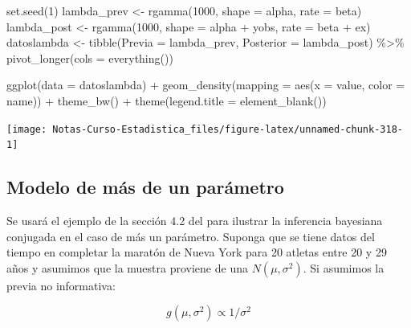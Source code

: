 \documentclass[
  12pt,
]{book}
\newenvironment{Shaded}{\begin{snugshade}}{\end{snugshade}}
\newcommand{\AttributeTok}[1]{\textcolor[rgb]{0.77,0.63,0.00}{#1}}
\newcommand{\DecValTok}[1]{\textcolor[rgb]{0.00,0.00,0.81}{#1}}
\newcommand{\FunctionTok}[1]{\textcolor[rgb]{0.00,0.00,0.00}{#1}}
\newcommand{\NormalTok}[1]{#1}
\newcommand{\OtherTok}[1]{\textcolor[rgb]{0.56,0.35,0.01}{#1}}
\newcommand{\SpecialCharTok}[1]{\textcolor[rgb]{0.00,0.00,0.00}{#1}}
\theoremstyle{definition}
\theoremstyle{definition}
\theoremstyle{definition}
\theoremstyle{definition}
\theoremstyle{remark}
\begin{document}
\begin{Shaded}
\begin{Highlighting}[]
\FunctionTok{set.seed}\NormalTok{(}\DecValTok{1}\NormalTok{)}
\NormalTok{lambda\_prev }\OtherTok{\textless{}{-}} \FunctionTok{rgamma}\NormalTok{(}\DecValTok{1000}\NormalTok{, }\AttributeTok{shape =}\NormalTok{ alpha, }\AttributeTok{rate =}\NormalTok{ beta)}
\NormalTok{lambda\_post }\OtherTok{\textless{}{-}} \FunctionTok{rgamma}\NormalTok{(}\DecValTok{1000}\NormalTok{, }\AttributeTok{shape =}\NormalTok{ alpha }\SpecialCharTok{+}\NormalTok{ yobs, }\AttributeTok{rate =}\NormalTok{ beta }\SpecialCharTok{+}
\NormalTok{    ex)}
\NormalTok{datoslambda }\OtherTok{\textless{}{-}} \FunctionTok{tibble}\NormalTok{(}\AttributeTok{Previa =}\NormalTok{ lambda\_prev, }\AttributeTok{Posterior =}\NormalTok{ lambda\_post) }\SpecialCharTok{\%\textgreater{}\%}
    \FunctionTok{pivot\_longer}\NormalTok{(}\AttributeTok{cols =} \FunctionTok{everything}\NormalTok{())}

\FunctionTok{ggplot}\NormalTok{(}\AttributeTok{data =}\NormalTok{ datoslambda) }\SpecialCharTok{+} \FunctionTok{geom\_density}\NormalTok{(}\AttributeTok{mapping =} \FunctionTok{aes}\NormalTok{(}\AttributeTok{x =}\NormalTok{ value,}
    \AttributeTok{color =}\NormalTok{ name)) }\SpecialCharTok{+} \FunctionTok{theme\_bw}\NormalTok{() }\SpecialCharTok{+} \FunctionTok{theme}\NormalTok{(}\AttributeTok{legend.title =} \FunctionTok{element\_blank}\NormalTok{())}
\end{Highlighting}
\end{Shaded}

\begin{center}\texttt{[image: Notas-Curso-Estadistica\_files/figure-latex/unnamed-chunk-318-1]} \end{center}

\hypertarget{modelo-de-muxe1s-de-un-paruxe1metro}{%
\subsection{Modelo de más de un parámetro}\label{modelo-de-muxe1s-de-un-paruxe1metro}}

Se usará el ejemplo de la sección 4.2 del \autocite{Albert2009} para ilustrar la inferencia bayesiana conjugada en el caso de más un parámetro. Suponga que se tiene datos del tiempo en completar la maratón de Nueva York para 20 atletas entre 20 y 29 años y asumimos que la muestra proviene de una \(N(\mu,\sigma^2)\). Si asumimos la previa no informativa:

\[g(\mu,\sigma^2) \propto 1/\sigma^2\]
\end{document}
